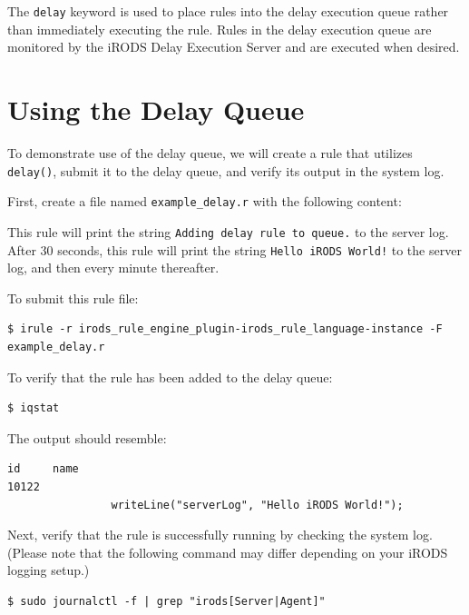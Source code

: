 \documentclass[10pt,oneside]{memoir}
\begin{document}
The \texttt{delay} keyword is used to place rules into the delay execution queue rather than immediately executing the rule. Rules in the delay execution queue are monitored by the iRODS Delay Execution Server and are executed when desired.

\section{Using the Delay Queue}

To demonstrate use of the delay queue, we will create a rule that utilizes \texttt{delay()}, submit it to the delay queue, and verify its output in the system log.

First, create a file named \texttt{example\_delay.r} with the following content:

\begin{lrbox}{\exampleDelayRule}

\end{lrbox}
\href{https://raw.githubusercontent.com/irods/irods_training/ugm2026/beginner/example_delay.r}{\usebox{\exampleDelayRule}}

This rule will print the string \texttt{Adding delay rule to queue.} to the server log. After 30 seconds, this rule will print the string \texttt{Hello iRODS World!} to the server log, and then every minute thereafter.

To submit this rule file:

\begin{lstlisting}
$ irule -r irods_rule_engine_plugin-irods_rule_language-instance -F example_delay.r
\end{lstlisting}

To verify that the rule has been added to the delay queue:

\begin{lstlisting}
$ iqstat
\end{lstlisting}

The output should resemble:
\begin{lstlisting}
id     name
10122  
                writeLine("serverLog", "Hello iRODS World!");
\end{lstlisting}

Next, verify that the rule is successfully running by checking the system log. (Please note that the following command may differ depending on your iRODS logging setup.)

\begin{lstlisting}
$ sudo journalctl -f | grep "irods[Server|Agent]"
\end{lstlisting}
\end{document}
